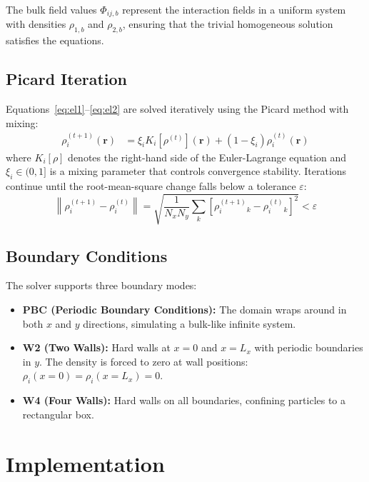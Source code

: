 \documentclass[conference]{IEEEtran}
\begin{document}
The bulk field values $\Phi_{ij,b}$ represent the interaction fields in a uniform system with densities $\rho_{1,b}$ and $\rho_{2,b}$, ensuring that the trivial homogeneous solution satisfies the equations.

\subsection{Picard Iteration}

Equations~\eqref{eq:el1}--\eqref{eq:el2} are solved iteratively using the Picard method with mixing:
\begin{align}
\rho_i^{(t+1)}(\mathbf{r}) &= \xi_i K_i[\rho^{(t)}](\mathbf{r}) + (1 - \xi_i) \rho_i^{(t)}(\mathbf{r})
\label{eq:picard}
\end{align}
where $K_i[\rho]$ denotes the right-hand side of the Euler-Lagrange equation and $\xi_i \in (0,1]$ is a mixing parameter that controls convergence stability. Iterations continue until the root-mean-square change falls below a tolerance $\varepsilon$:
\begin{equation}
\left\|\rho_i^{(t+1)} - \rho_i^{(t)}\right\| = \sqrt{\frac{1}{N_x N_y} \sum_{k} \left[\rho_i^{(t+1)}{_k} - \rho_i^{(t)}{_k}\right]^2} < \varepsilon
\label{eq:convergence}
\end{equation}

\subsection{Boundary Conditions}

The solver supports three boundary modes:
\begin{itemize}
    \item \textbf{PBC (Periodic Boundary Conditions):} The domain wraps around in both $x$ and $y$ directions, simulating a bulk-like infinite system.
    \item \textbf{W2 (Two Walls):} Hard walls at $x = 0$ and $x = L_x$ with periodic boundaries in $y$. The density is forced to zero at wall positions: $\rho_i(x=0) = \rho_i(x=L_x) = 0$.
    \item \textbf{W4 (Four Walls):} Hard walls on all boundaries, confining particles to a rectangular box.
\end{itemize}

\section{Implementation}
\end{document}
